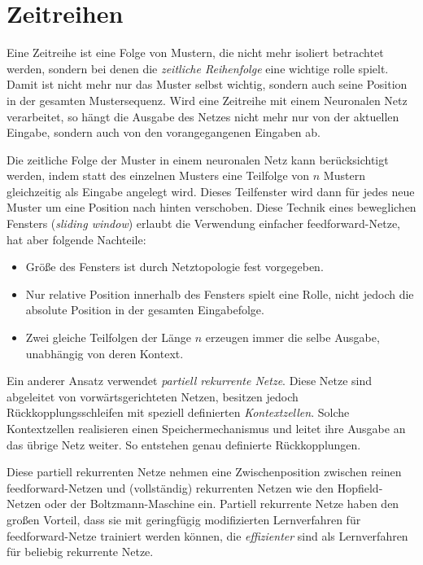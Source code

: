 \section*{Zeitreihen}
Eine Zeitreihe ist eine Folge von Mustern, die nicht mehr isoliert betrachtet werden, sondern bei denen die \emph{zeitliche Reihenfolge} eine wichtige rolle spielt. Damit ist nicht mehr nur das Muster selbst wichtig, sondern auch seine Position in der gesamten Mustersequenz.
Wird eine Zeitreihe mit einem Neuronalen Netz verarbeitet, so hängt die Ausgabe des Netzes nicht mehr nur von der aktuellen Eingabe, sondern auch von den vorangegangenen Eingaben ab.

Die zeitliche Folge der Muster in einem neuronalen Netz kann berücksichtigt werden, indem statt des einzelnen Musters eine Teilfolge von $n$ Mustern gleichzeitig als Eingabe angelegt wird. Dieses Teilfenster wird dann für jedes neue Muster um eine Position nach hinten verschoben. Diese Technik eines beweglichen Fensters (\emph{sliding window}) erlaubt die Verwendung einfacher feedforward-Netze, hat aber folgende Nachteile:

\begin{itemize}
	\item Größe des Fensters ist durch Netztopologie fest vorgegeben.
	\item Nur relative Position innerhalb des Fensters spielt eine Rolle, nicht jedoch die absolute Position in der gesamten Eingabefolge.
	\item Zwei gleiche Teilfolgen der Länge $n$ erzeugen immer die selbe Ausgabe, unabhängig von deren Kontext.
\end{itemize}

Ein anderer Ansatz verwendet \emph{partiell rekurrente Netze}. Diese Netze sind abgeleitet von vorwärtsgerichteten Netzen, besitzen jedoch Rückkopplungsschleifen mit speziell definierten \emph{Kontextzellen}. Solche Kontextzellen realisieren einen Speichermechanismus und leitet ihre Ausgabe an das übrige Netz weiter. So entstehen genau definierte Rückkopplungen.

Diese partiell rekurrenten Netze nehmen eine Zwischenposition zwischen reinen feedforward-Netzen und (vollständig) rekurrenten Netzen wie den Hopfield-Netzen oder der Boltzmann-Maschine ein.
Partiell rekurrente Netze haben den großen Vorteil, dass sie mit geringfügig modifizierten Lernverfahren für feedforward-Netze trainiert werden können, die \emph{effizienter} sind als Lernverfahren für beliebig rekurrente Netze.

